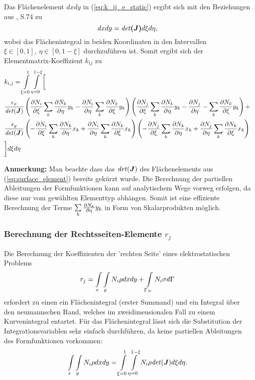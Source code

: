 Das Flächenelement $dxdy$ in (\ref{eq:k_ij_e_static}) ergibt sich mit den Beziehungen aus \cite{SMS_VO_skript}, S.74 zu 
\begin{equation}
\label{eq:surface_element}
dxdy = \mathit{det} \boldsymbol{(J)} d\xi d\eta,
\end{equation}
wobei das Flächenintegral in beiden Koordinaten in den Intervallen $\xi \in [0,1], \ \eta \in [0, 1-\xi]$ durchzuführen ist. Somit ergibt sich der Elementmatrix-Koeffizient $k_{ij}$ zu 
\begin{align}
&k_{i,j} = \int\displaylimits_{\xi = 0}^{1} \int\displaylimits_{\eta = 0}^{1 - \xi} \bigg[\\
%
&\frac{\epsilon_x}{\mathit{det}(\mat{J})}\left(\parDiff{N_i}{\xi}\sum\limits_{k}\parDiff{N_k}{\eta}y_k - \parDiff{N_i}{\eta}\sum\limits_{k}\parDiff{N_k}{\xi}y_k\right)
%
\left(\parDiff{N_j}{\xi}\sum\limits_{k}\parDiff{N_k}{\eta}y_k - \parDiff{N_j}{\eta} -\sum\limits_{k}\parDiff{N_k}{\xi}y_k\right) + \nonumber\\ 
%
&\frac{\epsilon_y}{\mathit{det}(\mat{J})}\left(-\parDiff{N_i}{\xi}\sum\limits_{k}\parDiff{N_k}{\eta}x_k + \parDiff{N_i}{\eta} \sum\limits_{k}\parDiff{N_k}{\xi}x_k\right)
%
\left(-\parDiff{N_j}{\xi}\sum\limits_{k}\parDiff{N_k}{\eta}x_k + \parDiff{N_j}{\eta} \sum\limits_{k}\parDiff{N_k}{\xi}x_k\right) \nonumber\\ 
& \bigg]d\xi d\eta
\end{align}

\textbf{Anmerkung:} Man beachte dass das $\mathit{det}(\boldsymbol{J})$ des Flächenelements aus (\ref{eq:surface_element}) bereits gekürzt wurde.\newline
Die Berechnung der partiellen Ableitungen der Formfunktionen kann auf analytischem Wege vorweg erfolgen, da diese nur vom gewählten Elementtyp abhängen. Somit ist eine effiziente Berechnung der Terme $\sum\limits_{k}\frac{\partial N_k}{\partial \eta}y_k$ in Form von Skalarprodukten möglich.\newline


\subsubsection{Berechnung der Rechtsseiten-Elemente $r_j$}
Die Berechnung der Koeffizienten der 'rechten Seite' eines elektrostatischen Problems 
\begin{equation}
r_j = \int\displaylimits_{x} \int\displaylimits_{y} N_i \rho dx dy + \int\displaylimits_{\Gamma_N} N_i\sigma d\Gamma
\end{equation}
erfordert zu einen ein Flächenintegral (erster Summand) und ein Integral über den neumannschen Rand, welches im zweidimensionalen Fall zu einem Kurvenintegral entartet. \newline
Für das Flächenintegral lässt sich die Substitution der Integrationsvariablen sehr einfach durchführen, da keine partiellen Ableitungen des Formfunktionen vorkommen:
\begin{equation}
\int\displaylimits_{x} \int\displaylimits_{y} N_i \rho dx dy = \int\displaylimits_{\xi = 0}^{1} \int\displaylimits_{\eta = 0}^{1 - \xi} N_i \rho \mathit{det} (\boldsymbol{J}) d\xi d\eta.
\end{equation}
\newline

